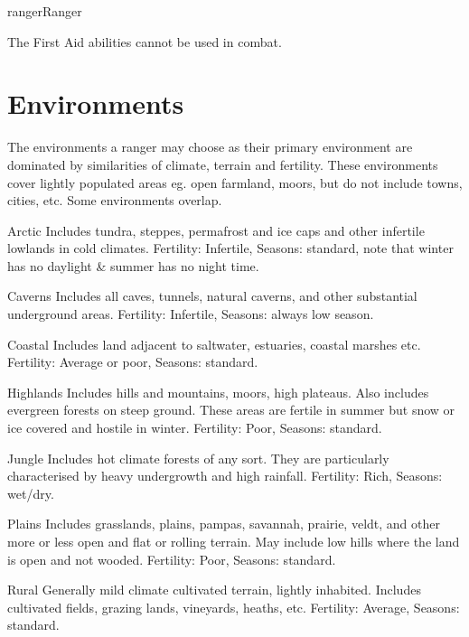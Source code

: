 \begin{Skill}[2.1]{ranger}{Ranger}
\begin{Description}
The First Aid abilities cannot be used in combat.

\end{Description}

\section{Environments}
\label{ranger:environments}
The environments a ranger may choose as their primary environment are
dominated by similarities of climate, terrain and fertility. These
environments cover lightly populated areas eg.  open farmland, moors,
but do not include towns, cities, etc.  Some environments overlap.

\begin{Description}

\item[Arctic] Includes tundra, steppes, permafrost and ice caps and
  other infertile lowlands in cold climates.  Fertility: Infertile,
  Seasons: standard, note that winter has no daylight \& summer has no
  night time.

\item[Caverns] Includes all caves, tunnels, natural caverns, and other
  substantial underground areas.  Fertility: Infertile, Seasons:
  always low season.

\item[Coastal] Includes land adjacent to saltwater, estuaries, coastal
  marshes etc. Fertility: Average or poor, Seasons: standard.

\item[Highlands] Includes hills and mountains, moors, high plateaus.
  Also includes evergreen forests on steep ground. These areas are
  fertile in summer but snow or ice covered and hostile in
  winter. Fertility: Poor, Seasons: standard.

\item[Jungle] Includes hot climate forests of any sort.  They are
  particularly characterised by heavy undergrowth and high rainfall.
  Fertility: Rich, Seasons: wet/dry.

\item[Plains] Includes grasslands, plains, pampas, savannah, prairie,
  veldt, and other more or less open and flat or rolling terrain. May
  include low hills where the land is open and not wooded.  Fertility:
  Poor, Seasons: standard.

\item[Rural] Generally mild climate cultivated terrain, lightly
  inhabited. Includes cultivated fields, grazing lands, vineyards,
  heaths, etc.  Fertility: Average, Seasons: standard.


\end{Description}
\end{Skill}
